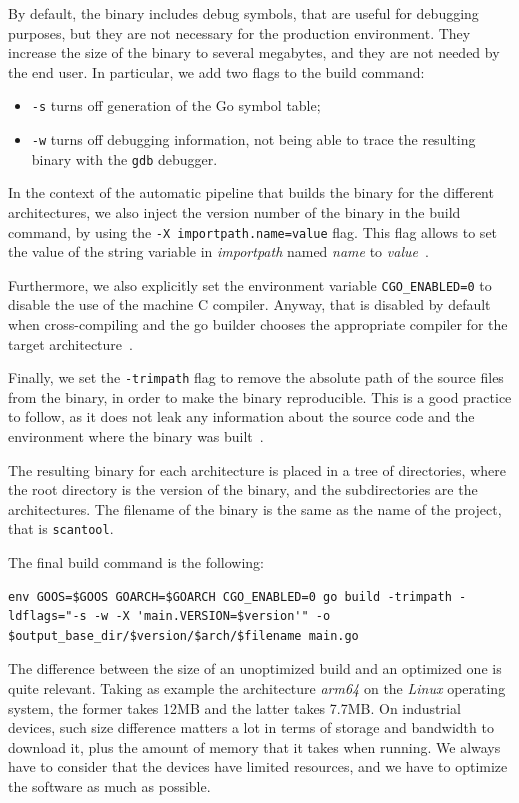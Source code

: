 By default, the binary includes debug symbols, that are useful for debugging purposes, but they are not necessary for the production environment. They increase the size of the binary to several megabytes, and they are not needed by the end user. In particular, we add two flags to the build command:~\cite{go-ldflags-all,go-ldflags-s-w}
\begin{itemize}
  \item \texttt{-s} turns off generation of the Go symbol table;
  \item \texttt{-w} turns off debugging information, not being able to trace the resulting binary with the \texttt{gdb} debugger.
\end{itemize}

In the context of the automatic pipeline that builds the binary for the different architectures, we also inject the version number of the binary in the build command, by using the \texttt{-X importpath.name=value} flag. This flag allows to set the value of the string variable in \textit{importpath} named \textit{name} to \textit{value}~\cite{go-ldflags-all}.

Furthermore, we also explicitly set the environment variable \texttt{CGO\_ENABLED=0} to disable the use of the machine C compiler. Anyway, that is disabled by default when cross-compiling and the go builder chooses the appropriate compiler for the target architecture~\cite{go-cgo-compiler}.

Finally, we set the \texttt{-trimpath} flag to remove the absolute path of the source files from the binary, in order to make the binary reproducible. This is a good practice to follow, as it does not leak any information about the source code and the environment where the binary was built~\cite{go-trimpath-arg}.

The resulting binary for each architecture is placed in a tree of directories, where the root directory is the version of the binary, and the subdirectories are the architectures. The filename of the binary is the same as the name of the project, that is \texttt{scantool}.

The final build command is the following:
\begin{lstlisting}[caption={Go tool cross-build command}]
  env GOOS=$GOOS GOARCH=$GOARCH CGO_ENABLED=0 go build -trimpath -ldflags="-s -w -X 'main.VERSION=$version'" -o $output_base_dir/$version/$arch/$filename main.go
\end{lstlisting}

The difference between the size of an unoptimized build and an optimized one is quite relevant. Taking as example the architecture \textit{arm64} on the \textit{Linux} operating system, the former takes 12MB and the latter takes 7.7MB. On industrial devices, such size difference matters a lot in terms of storage and bandwidth to download it, plus the amount of memory that it takes when running. We always have to consider that the devices have limited resources, and we have to optimize the software as much as possible.

